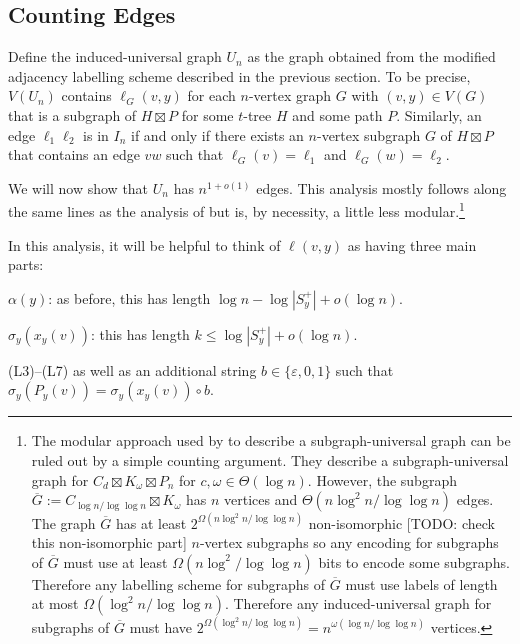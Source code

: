 \documentclass{patmorin}
\begin{document}
\subsection{Counting Edges}

Define the induced-universal graph $U_n$ as the graph obtained from the modified adjacency labelling scheme described in the previous section.  To be precise, $V(U_n)$ contains $\ell_G(v,y)$ for each $n$-vertex graph $G$ with $(v,y)\in V(G)$ that is a subgraph of $H\boxtimes P$ for some $t$-tree $H$ and some path $P$.  Similarly, an edge $\ell_1\ell_2$ is in $I_n$ if and only if there exists an $n$-vertex subgraph $G$ of $H\boxtimes P$ that contains an edge $vw$ such that $\ell_G(v)=\ell_1$ and $\ell_G(w)=\ell_2$.

We will now show that $U_n$ has $n^{1+o(1)}$ edges.  This analysis mostly follows along the same lines as the analysis of \citet{esperet.joret.ea:sparse} but is, by necessity, a little less modular.\footnote{The modular approach used by \citet{esperet.joret.ea:sparse} to describe a subgraph-universal graph can be ruled out by a simple counting argument.  They describe a subgraph-universal graph for $C_d\boxtimes K_\omega\boxtimes P_n$ for $c,\omega\in\Theta(\log n)$.  However, the subgraph $\overline{G}:=C_{\log n/\log\log n}\boxtimes K_\omega$ has $n$ vertices and $\Theta(n\log^2 n/\log\log n)$ edges.  The graph $\overline{G}$ has at least $2^{\Omega(n\log^2 n/\log\log n)}$ non-isomorphic [TODO: check this non-isomorphic part] $n$-vertex subgraphs so any encoding for subgraphs of $\overline{G}$ must use at least $\Omega(n\log^2/\log\log n)$ bits to encode some subgraphs.  Therefore any labelling scheme for subgraphs of $\overline{G}$ must use labels of length at most $\Omega(\log^2 n/\log\log n)$.  Therefore any induced-universal graph for subgraphs of $\overline{G}$ must have $2^{\Omega(\log^2 n/\log\log n)}=n^{\omega(\log n/\log\log n)}$ vertices.}

In this analysis, it will be helpful to think of $\ell(v,y)$ as having three main parts:
\begin{compactenum}[(L1$^\star$)]
    \item $\alpha(y)$: as before, this has length $\log n-\log |S^+_y| + o(\log n)$.
    \item $\sigma_y(x_y(v))$: this has length $k\le \log |S^+_y| + o(\log n)$.
    \item (L3)--(L7) as well as an additional string $b\in\{\varepsilon, 0, 1\}$ such that $\sigma_y(P_y(v)) = \sigma_y(x_y(v))\mathbin{\circ} b$.
\end{compactenum}
\end{document}
